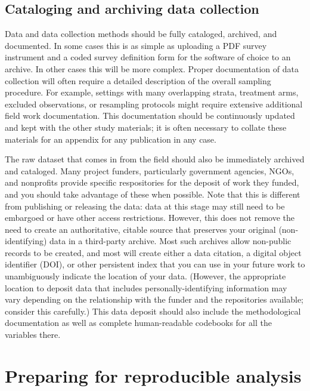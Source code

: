 \subsection{Cataloging and archiving data collection}

Data and data collection methods should be fully cataloged, archived, and documented.
In some cases this is as simple as uploading a PDF survey instrument
and a coded survey definition form for the software of choice to an archive.
In other cases this will be more complex.
Proper documentation of data collection will often require
a detailed description of the overall sampling procedure.
For example, settings with many overlapping strata,
treatment arms, excluded observations, or resampling protocols
might require extensive additional field work documentation.
This documentation should be continuously updated
and kept with the other study materials;
it is often necessary to collate these materials
for an appendix for any publication in any case.

The raw dataset that comes in from the field should also be immediately archived and cataloged.
Many project funders, particularly government agencies, NGOs, and nonprofits
provide specific respositories for the deposit of work they funded,
and you should take advantage of these when possible.
Note that this is different from publishing or releasing the data:
data at this stage may still need to be embargoed
or have other access restrictions.
However, this does not remove the need to create an authoritative, citable source
that preserves your original (non-identifying) data in a third-party archive.
Most such archives allow non-public records to be created,
and most will create either a data citation, a digital object identifier (DOI),
or other persistent index that you can use in your future work
to unambiguously indicate the location of your data.
(However, the appropriate location to deposit data
that includes personally-identifying information
may vary depending on the relationship with the funder
and the repositories available; consider this carefully.)
This data deposit should also include the methodological documentation
as well as complete human-readable codebooks for all the variables there.

\section{Preparing for reproducible analysis}


